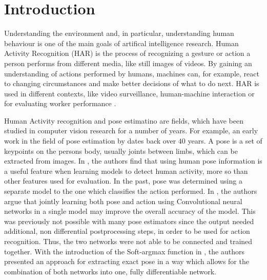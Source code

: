 \chapter{Introduction}



Understanding the environment and, in particular, understanding human behaviour is one of the main goals of artifical intelligence research.
Human Activity Recognition (HAR) is the process of recognizing a gesture or action a person performs from different media, like still images of videos.
By gaining an understanding of actions performed by humans, machines can, for example, react to changing circumstances and make better decisions of what to do next.
HAR is used in different contexts, like video surveillance, human-machine interaction or
for evaluating worker performance \cite{reining_towards_2018}.

Human Activity recognition and pose estimatino are fields, which have been studied in computer vision research for a number of years.
For example, an early work in the field of pose estimation by \cite{fischler_representation_1973} dates back over $40$ years.
A pose is a set of keypoints on the persons body, usually joints between limbs, which can be extracted from images.
In \cite{jhuang_towards_2013}, the authors find that using human pose information is a useful feature when learning models to detect human activity, more so than other features used for evaluation.
In the past, pose was determined using a separate model to the one which classifies the action performed.
In \cite{luvizon_2d/3d_2018}, the authors argue that jointly learning both pose and action using Convolutional neural networks in a single model may improve the overall accuracy of the model.
This was previously not possible with many pose estimators since the output needed additional, non differential postprocessing steps, in order to be used for action recognition.
Thus, the two networks were not able to be connected and trained together.
With the introduction of the Soft-argmax function in \cite{luvizon_human_2017}, the authors presented an approach for extracting exact pose in a way which allows for the combination of both networks into one, fully differentiable network.

